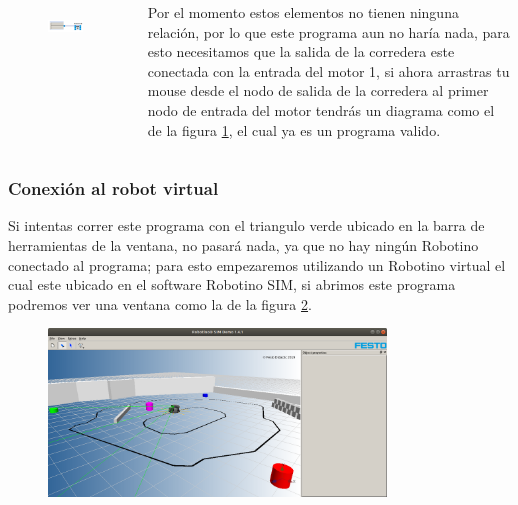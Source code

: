 \begin{frame}
	\begin{columns}
		\begin{figure}
			\begin{center}
				\includegraphics[width=0.9\textwidth]{images/00-inicio/05.png}
				\label{fig:inicio-05}
			\end{center}
		\end{figure}

		Por el momento estos elementos no tienen ninguna relación, por lo que este programa aun no haría nada, para esto necesitamos que la salida de la corredera este conectada con la entrada del motor 1, si ahora arrastras tu mouse desde el nodo de salida de la corredera al primer nodo de entrada del motor tendrás un diagrama como el de la figura \ref{fig:inicio-05}, el cual ya es un programa valido.
	\end{columns}
\end{frame}

\begin{frame}
	\frametitle{Conexión al robot virtual}
		Si intentas correr este programa con el triangulo verde ubicado en la barra de herramientas de la ventana, no pasará nada, ya que no hay ningún Robotino conectado al programa; para esto empezaremos utilizando un Robotino virtual el cual este ubicado en el software Robotino SIM, si abrimos este programa podremos ver una ventana como la de la figura \ref{fig:conexion-01}.

		\begin{figure}
			\begin{center}
				\includegraphics[width=0.8\textwidth]{images/01-conexion/01.png}
				\label{fig:conexion-01}
			\end{center}
		\end{figure}
\end{frame}

